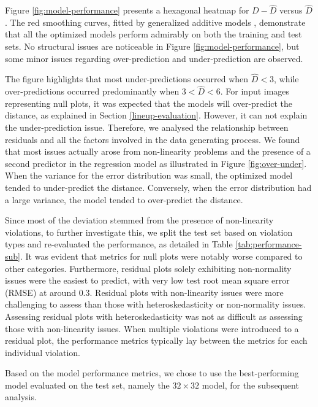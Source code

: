 \documentclass[]{interact}
\theoremstyle{plain}%
\theoremstyle{definition}
\theoremstyle{remark}
\begin{document}
Figure \ref{fig:model-performance} presents a hexagonal heatmap for
\(D - \hat{D}\) versus \(\hat{D}\). The red smoothing curves, fitted by
generalized additive models \citep{hastie2017generalized}, demonstrate
that all the optimized models perform admirably on both the training and
test sets. No structural issues are noticeable in Figure
\ref{fig:model-performance}, but some minor issues regarding
over-prediction and under-prediction are observed.

The figure highlights that most under-predictions occurred when
\(\hat{D} < 3\), while over-predictions occurred predominantly when
\(3 < \hat{D} < 6\). For input images representing null plots, it was
expected that the models will over-predict the distance, as explained in
Section \ref{lineup-evaluation}. However, it can not explain the
under-prediction issue. Therefore, we analysed the relationship between
residuals and all the factors involved in the data generating process.
We found that most issues actually arose from non-linearity problems and
the presence of a second predictor in the regression model as
illustrated in Figure \ref{fig:over-under}. When the variance for the
error distribution was small, the optimized model tended to
under-predict the distance. Conversely, when the error distribution had
a large variance, the model tended to over-predict the distance.

Since most of the deviation stemmed from the presence of non-linearity
violations, to further investigate this, we split the test set based on
violation types and re-evaluated the performance, as detailed in Table
\ref{tab:performance-sub}. It was evident that metrics for null plots
were notably worse compared to other categories. Furthermore, residual
plots solely exhibiting non-normality issues were the easiest to
predict, with very low test root mean square error (RMSE) at around
\(0.3\). Residual plots with non-linearity issues were more challenging
to assess than those with heteroskedasticity or non-normality issues.
Assessing residual plots with heteroskedasticity was not as difficult as
assessing those with non-linearity issues. When multiple violations were
introduced to a residual plot, the performance metrics typically lay
between the metrics for each individual violation.

Based on the model performance metrics, we chose to use the
best-performing model evaluated on the test set, namely the
\(32 \times 32\) model, for the subsequent analysis.
\end{document}
